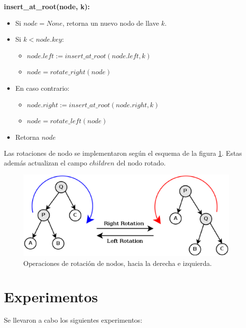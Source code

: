 \documentclass[12pt,letterpaper]{article}
\begin{document}
\textbf{insert\_at\_root(node, k):}
\begin{itemize}
\item	Si $node = None$, retorna un nuevo nodo de llave $k$.
\item	Si $k < node.key$:
	\begin{itemize}
	\item	$node.left := insert\_at\_root(node.left, k)$
	\item	$node = rotate\_right(node)$
	\end{itemize}
\item	En caso contrario:
	\begin{itemize}
	\item	$node.right := insert\_at\_root(node.right, k)$
	\item	$node = rotate\_left(node)$
	\end{itemize}
\item	Retorna $node$
\end{itemize}

Las rotaciones de nodo se implementaron según el esquema de la figura \ref{fig:rotaciones}. Estas además actualizan el campo $children$ del nodo rotado.

\begin{figure}[ht]
\centering
\includegraphics[scale=0.7]{rotations.eps}
\caption{Operaciones de rotación de nodos, hacia la derecha e izquierda.}
\label{fig:rotaciones}
\end{figure}

\section{Experimentos}
\label{sec:exp}
Se llevaron a cabo los siguientes experimentos:
\end{document}

